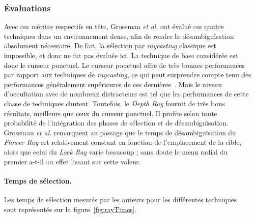 	\subsubsection{Évaluations}
	Avec ces mérites respectifs en tête, Grossman \emph{et al.} ont évalué ces quatre techniques dans un environnement dense, afin de rendre la désambiguïsation absolument nécessaire. De fait, la sélection par \emph{raycasting} classique est impossible, et donc ne fut pas évaluée ici. La technique de base considérée est donc le curseur ponctuel. Le curseur ponctuel offre de très bonnes performances par rapport aux techniques de \emph{raycasting}, ce qui peut surprendre compte tenu des performances généralement supérieures de ces dernières~\cite{bowman2001testbed}. Mais le niveau d'occultation avec de nombreux distracteurs est tel que les  performances de cette classe de techniques chutent. Toutefois, le  \emph{Depth Ray} fournit de très bons résultats, meilleurs que ceux du curseur ponctuel. Il profite selon toute probabilité de l'intégration des phases de sélection et de désambiguïsation. Grossman \emph{et al.} remarquent au passage que le temps de désambiguïsation du \emph{Flower Ray} est relativement constant en fonction de l'emplacement de la cible, alors que celui du \emph{Lock Ray} varie beaucoup ; sans doute le menu radial du premier a-t-il un effet lissant sur cette valeur.


	\paragraph{Temps de sélection.}
	
	Les temps de sélection mesurés par les auteurs pour les différentes techniques sont représentés sur la figure~\ref{fig:rayTimes}.
	

